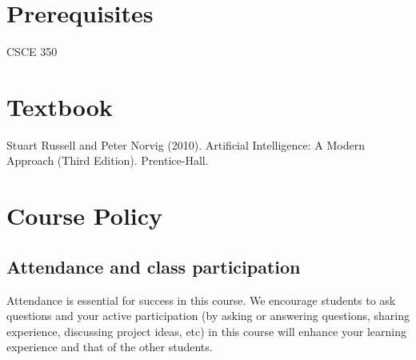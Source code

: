 \documentclass[11pt]{article}
\begin{document}
\section*{Prerequisites}

CSCE 350

\section*{Textbook}

Stuart Russell and Peter Norvig (2010). Artificial Intelligence: A Modern Approach (Third Edition). Prentice-Hall.


\section*{Course Policy}


\subsection*{Attendance and class participation}
Attendance is essential for success in this course. We encourage students to ask questions and your active participation (by asking or answering questions, sharing experience, discussing project ideas, etc) in this course will enhance your learning experience and that of the other students.



\end{document}
